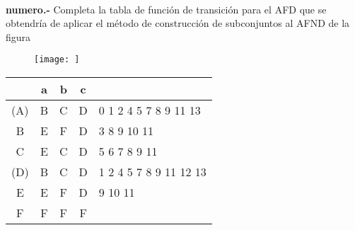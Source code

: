 \paragraph{}
\textbf{{numero}.-} Completa la tabla de función de transición para el AFD que se obtendría de aplicar el método de construcción de subconjuntos al AFND de la figura
\begin{figure}[ht!]
\centering
\texttt{[image: ]}
\end{figure}

\begin{tabular} {| c | c |c |c | l |}
\hline 
& a & b & c & \\ \hline
(A) & B & C & D & 0 1 2 4 5 7 8 9 11 13 \\ \hline
B & E & F & D & 3 8 9 10 11 \\ \hline
C & E & C & D & 5 6 7 8 9 11 \\ \hline
(D) & B & C & D & 1 2 4 5 7 8 9 11 12 13 \\ \hline
E & E & F & D & 9 10 11 \\ \hline
F & F & F & F & \\ \hline
\end{tabular}